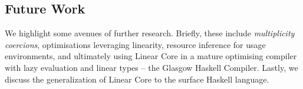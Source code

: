 \documentclass[acmsmall,review]{acmart}
\newcommand{\parawith}[1]{\paragraph{\emph{#1}}}
\begin{document}

% 

% 

\subsection{Future Work\label{sec:future-work}}

We highlight some avenues of further research. Briefly,
these include \emph{multiplicity coercions}, optimisations leveraging
linearity, resource inference for usage environments, and ultimately using
Linear Core in a mature optimising compiler with lazy evaluation and linear
types -- the Glasgow Haskell Compiler. Lastly, we discuss the
generalization of Linear Core to the surface Haskell language.
\end{document}
